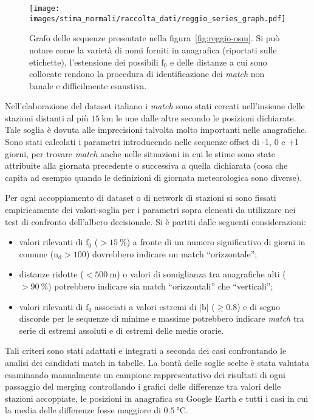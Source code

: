 \begin{figure}[ht]
  \centering
  \texttt{[image: images/stima\_normali/raccolta\_dati/reggio\_series\_graph.pdf]}
  \caption{Grafo delle sequenze presentate nella figura~\ref{fig:reggio-osm}. Si può notare come la varietà di nomi forniti in anagrafica (riportati sulle etichette), l'estensione dei possibili \(\mathrm{f}_0\) e delle distanze a cui sono collocate rendono la procedura di identificazione dei \emph{match} non banale e difficilmente esaustiva.}\label{fig:reggio-graph}
\end{figure}

Nell'elaborazione del dataset italiano i \emph{match} sono stati cercati nell'insieme delle stazioni distanti al più \(15\:\mathrm{km}\) le une dalle altre secondo le posizioni dichiarate. Tale soglia è dovuta alle imprecisioni talvolta molto importanti nelle anagrafiche. Sono stati calcolati i parametri introducendo nelle sequenze offset di -1, 0 e +1 giorni, per trovare \emph{match} anche nelle situazioni in cui le stime sono state attribuite alla giornata precedente o successiva a quella dichiarata (cosa che capita ad esempio quando le definizioni di giornata meteorologica sono diverse).

Per ogni accoppiamento di dataset o di network di stazioni si sono fissati empiricamente dei valori-soglia per i parametri sopra elencati da utilizzare nei test di confronto dell'albero decisionale. Si è partiti dalle seguenti considerazioni:

\begin{itemize}
  \item
    valori rilevanti di \(\mathrm{f}_0\) (\(> \qty{15}{\percent}\)) a fronte di un numero significativo di giorni in comune (\(\mathrm{n_d} > 100\)) dovrebbero indicare un match ``orizzontale'';
  \item
    distanze ridotte (\(< 500\:\mathrm{m}\)) o valori di somiglianza tra anagrafiche alti (\(> \qty{90}{\percent}\)) potrebbero indicare sia match ``orizzontali'' che ``verticali'';
  \item
    valori rilevanti di \(\mathrm{f}_0\) associati a valori estremi di \(|\mathrm{b}|\) (\(\ge 0.8\)) e di segno discorde per le sequenze di minime e massime potrebbero indicare \emph{match} tra serie di estremi assoluti e di estremi delle medie orarie.
\end{itemize}

Tali criteri sono stati adattati e integrati a seconda dei casi confrontando le analisi dei candidati match in tabelle. La bontà delle soglie scelte è stata valutata esaminando manualmente un campione rappresentativo dei risultati di ogni passaggio del merging controllando i grafici delle differenze tra valori delle stazioni accoppiate, le posizioni in anagrafica su Google Earth e tutti i casi in cui la media delle differenze fosse maggiore di \(\qty{0.5}{\degreeCelsius}\).

